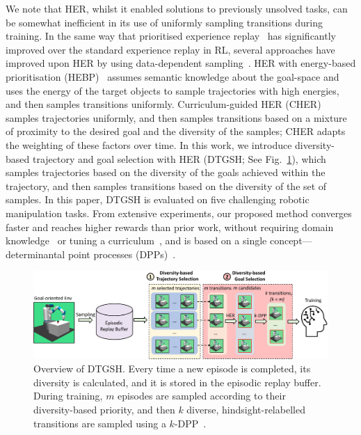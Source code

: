 We note that HER, whilst it enabled solutions to previously unsolved tasks, can be somewhat inefficient in its use of uniformly sampling transitions during training. In the same way that prioritised experience replay~\cite{schaul2016prioritized} has significantly improved over the standard experience replay in RL, several approaches have improved upon HER by using data-dependent sampling~\cite{fang2019curriculum,zhao2018energy}. HER with energy-based prioritisation (HEBP)~\cite{zhao2018energy} assumes semantic knowledge about the goal-space and uses the energy of the target objects to sample trajectories with high energies, and then samples transitions uniformly. Curriculum-guided HER (CHER)~\cite{fang2019curriculum} samples trajectories uniformly, and then samples transitions based on a mixture of proximity to the desired goal and the diversity of the samples; CHER adapts the weighting of these factors over time. In this work, we introduce diversity-based trajectory and goal selection with HER (DTGSH; See Fig.~\ref{fig:illustration}), which samples trajectories based on the diversity of the goals achieved within the trajectory, and then samples transitions based on the diversity of the set of samples. In this paper, DTGSH is evaluated on five challenging robotic manipulation tasks. From extensive experiments, our proposed method converges faster and reaches higher rewards than prior work, without requiring domain knowledge~\cite{zhao2018energy} or tuning a curriculum~\cite{fang2019curriculum}, and is based on a single concept---determinantal point processes (DPPs)~\cite{kulesza2012determinantal}.
\begin{figure}[h]
    \centering
    \includegraphics[width=\textwidth]{figures/chapter4/illustration_DTGSH_latest.pdf}
    \caption{Overview of DTGSH. Every time a new episode is completed, its diversity is calculated, and it is stored in the episodic replay buffer. During training, $m$ episodes are sampled according to their diversity-based priority, and then $k$ diverse, hindsight-relabelled transitions are sampled using a $k$-DPP~\cite{kulesza2011k}.}
    \label{fig:illustration}
\end{figure}

